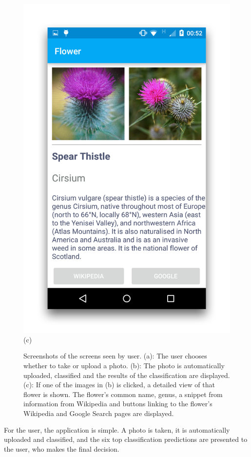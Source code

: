 \documentclass[11pt, a4paper]{report}
\begin{document}
\begin{figure}[h]
\begin{minipage}[b]{0.2\linewidth}
	\includegraphics[totalheight=6cm]{img/49.png}
	(c)
\end{minipage}
\caption{Screenshots of the screens seen by user. (a): The user chooses whether to take or upload a photo. (b): The photo is automatically uploaded, classified and the results of the classification are displayed. (c): If one of the images in (b) is clicked, a detailed view of that flower is shown. The flower's common name, genus, a snippet from information from Wikipedia and buttons linking to the flower's Wikipedia and Google Search pages are displayed.}
\label{img:47}
\end{figure}


For the user, the application is simple. A photo is taken, it is automatically uploaded and classified, and the six top classification predictions are presented to the user, who makes the final decision. 
\end{document}
